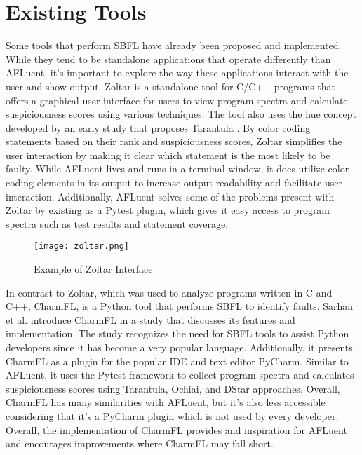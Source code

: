 \section{Existing Tools}
\label{sec:existing_tools}

Some tools that perform SBFL have already been proposed and implemented. While
they tend to be standalone applications that operate differently than AFLuent,
it's important to explore the way these applications interact with the user and
show output. Zoltar \cite{janssen2009zoltar} is a standalone tool for C/C++
programs that offers a
graphical user interface for users to view program spectra and calculate
suspiciousness scores using various techniques. The tool also uses the hue
concept developed by an early study that proposes Tarantula \cite{jones2002viz}.
By color coding statements based on their rank and suspiciousness scores, Zoltar
simplifies the user interaction by making it clear which statement is the most
likely to be faulty. While AFLuent lives and runs in a terminal window, it does
utilize color coding elements in its output to increase output readability and
facilitate user interaction. Additionally, AFLuent solves some of the problems
present with Zoltar by existing as a Pytest plugin, which gives it easy access
to program spectra such as test results and statement coverage.

\begin{figure}[!htb]
	\begin{center}
		\texttt{[image: zoltar.png]}
		\caption{\label{fig:zoltar} Example of Zoltar Interface \cite{janssen2009zoltar}}
	\end{center}
\end{figure}

In contrast to Zoltar, which was used to analyze programs written in C and C++,
CharmFL, is a Python tool that performs SBFL to identify faults. Sarhan et al.
\cite{sarhan2021charmfl} introduce CharmFL in a study that
discusses its features and implementation. The study recognizes the need for
SBFL tools to assist Python developers since it has become a very popular
language. Additionally, it presents CharmFL as a plugin for the popular IDE and
text editor PyCharm. Similar to AFLuent, it uses the Pytest framework to collect
program spectra and calculates suspiciousness scores using Tarantula, Ochiai,
and DStar approaches. Overall, CharmFL has many similarities with AFLuent, but
it's also less accessible considering that it's a PyCharm plugin which is not
used by every developer. Overall, the implementation of CharmFL provides and
inspiration for AFLuent and encourages improvements where CharmFL may fall
short.

